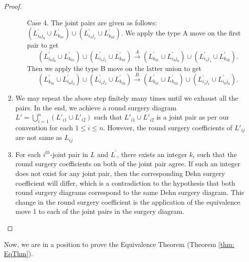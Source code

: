 \documentclass{amsart}
\theoremstyle{plain}
\theoremstyle{remark}
\theoremstyle{definition}
\begin{document}
\begin{proof}
\begin{enumerate}
\begin{enumerate}
        \item [Case 4.]  The joint pairs are given as follows: $(L^{\prime}_{i_0j_0} \cup L^{\prime}_{k_01}) \cup ( L^{\prime}_{i_1j_1}\cup L^{\prime}_{k_02})$.
        We apply the type A move on the first pair to get 
        $$(L^{\prime}_{i_0j_0} \cup L^{\prime}_{k_01}) \cup ( L^{\prime}_{i_1j_1}\cup L^{\prime}_{k_02})\xrightarrow[]{A}(L^{\prime}_{k_01} \cup L^{\prime}_{i_0j_0} ) \cup ( L^{\prime}_{i_1j_1}\cup L^{\prime}_{k_02}).$$ 
        Then we apply the type B move on the latter union to get   
        $$(L^{\prime}_{k_01} \cup L^{\prime}_{i_0j_0} ) \cup ( L^{\prime}_{i_1j_1}\cup L^{\prime}_{k_02})\xrightarrow[]{B}(L^{\prime}_{k_01} \cup L^{\prime}_{k_02}) \cup ( L^{\prime}_{i_1j_1}\cup L^{\prime}_{i_0j_0}).$$
    \end{enumerate}
    \item We may repeat the above step finitely many times until we exhaust all the pairs. 
    In the end, we achieve a round surgery diagram $L' = \bigcup_{i=1}^{n}(L'_{i1}\cup L'_{i2})$ such that $L'_{i1} \cup L'_{i2}$ is a joint pair as per our convention for each $1\leq i\leq n$. 
    However, the round surgery coefficients of $L'_{ij}$ are not same as $L_{ij}$ 
    \item For each $i^{th}$-joint pair in $L$ and $L^{\prime}$, there exists an integer $k_i$ such that the round surgery coefficients on both of the joint pair agree.
    If such an integer does not exist for any joint pair, then the corresponding Dehn surgery coefficient will differ, which is a contradiction to the hypothesis that both round surgery diagrams correspond to the same Dehn surgery diagram.
    This change in the round surgery coefficient is the application of the equivalence move 1 to each of the joint pairs in the surgery diagram. 
\end{enumerate}
\end{proof}

Now, we are in a position to prove the Equivalence Theorem (Theorem \ref{thm: EqThm}). 
\end{document}
